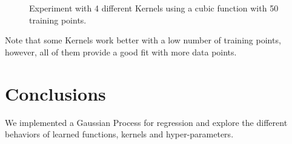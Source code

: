 \documentclass[]{IEEEtran}
\begin{document}
\begin{figure}[!ht]
  \centering
  \hspace{1mm}
  \hspace{1mm}
  \hspace{1mm}
  \hspace{1mm}
  \caption{Experiment with 4 different Kernels using a cubic function with 50 training points.}
  \label{Kernels}
\end{figure}\par
Note that some Kernels work better with a low number of training points, however, all of them provide a good fit with more data points.

\section{Conclusions}
We implemented a Gaussian Process for regression and explore the different behaviors of learned functions, kernels and hyper-parameters.
\end{document}
